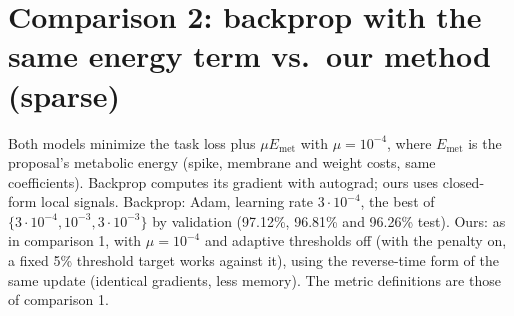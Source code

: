 \documentclass{article}
\begin{document}
\clearpage
\section*{Comparison 2: backprop with the same energy term vs.\ our method (sparse)}

Both models minimize the task loss plus $\mu E_{\mathrm{met}}$ with $\mu = 10^{-4}$, where $E_{\mathrm{met}}$ is the
proposal's metabolic energy (spike, membrane and weight costs, same coefficients). Backprop computes its gradient
with autograd; ours uses closed-form local signals. Backprop: Adam, learning rate $3\cdot 10^{-4}$, the best of
$\{3\cdot10^{-4}, 10^{-3}, 3\cdot10^{-3}\}$ by validation (97.12\%, 96.81\% and 96.26\% test). Ours: as in
comparison 1, with $\mu = 10^{-4}$ and adaptive thresholds off (with the penalty on, a fixed 5\% threshold target
works against it), using the reverse-time form of the same update (identical gradients, less memory). The metric
definitions are those of comparison 1.
\end{document}
